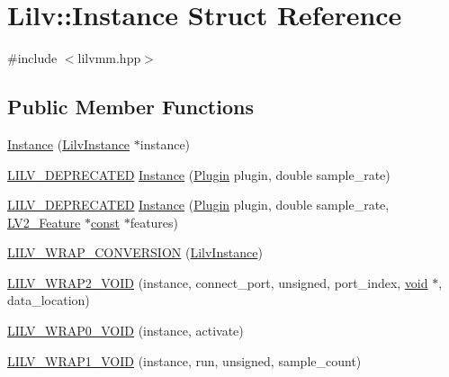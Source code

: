 \hypertarget{struct_lilv_1_1_instance}{}\section{Lilv\+:\+:Instance Struct Reference}
\label{struct_lilv_1_1_instance}


{\ttfamily \#include $<$lilvmm.\+hpp$>$}

\subsection*{Public Member Functions}
\begin{DoxyCompactItemize}
\item 
\hyperlink{struct_lilv_1_1_instance_af45ee5a3a37b886c6942b7970c3f14f7}{Instance} (\hyperlink{lilv_8h_acdb0d241e2506a6f59bd2d8dd427b99c}{Lilv\+Instance} $\ast$instance)
\item 
\hyperlink{lilvmm_8hpp_ad5b2c7073baa8fabd3c3b9429fee92a4}{L\+I\+L\+V\+\_\+\+D\+E\+P\+R\+E\+C\+A\+T\+ED} \hyperlink{struct_lilv_1_1_instance_a2df045ec92a0e8104b4bf7ab0bba9595}{Instance} (\hyperlink{struct_lilv_1_1_plugin}{Plugin} plugin, double sample\+\_\+rate)
\item 
\hyperlink{lilvmm_8hpp_ad5b2c7073baa8fabd3c3b9429fee92a4}{L\+I\+L\+V\+\_\+\+D\+E\+P\+R\+E\+C\+A\+T\+ED} \hyperlink{struct_lilv_1_1_instance_a65219ea225432cf20d4aa628cafb9b52}{Instance} (\hyperlink{struct_lilv_1_1_plugin}{Plugin} plugin, double sample\+\_\+rate, \hyperlink{lv2_8h_a78d13b607443404459db283371723234}{L\+V2\+\_\+\+Feature} $\ast$\hyperlink{getopt1_8c_a2c212835823e3c54a8ab6d95c652660e}{const} $\ast$features)
\item 
\hyperlink{struct_lilv_1_1_instance_a786fac19700a873f74b625e0bbff58f1}{L\+I\+L\+V\+\_\+\+W\+R\+A\+P\+\_\+\+C\+O\+N\+V\+E\+R\+S\+I\+ON} (\hyperlink{lilv_8h_acdb0d241e2506a6f59bd2d8dd427b99c}{Lilv\+Instance})
\item 
\hyperlink{struct_lilv_1_1_instance_a63179686a575cab5bdad5fbe55ab558f}{L\+I\+L\+V\+\_\+\+W\+R\+A\+P2\+\_\+\+V\+O\+ID} (instance, connect\+\_\+port, unsigned, port\+\_\+index, \hyperlink{sound_8c_ae35f5844602719cf66324f4de2a658b3}{void} $\ast$, data\+\_\+location)
\item 
\hyperlink{struct_lilv_1_1_instance_a4ab03ee90ad376ddf52701cc22d4a257}{L\+I\+L\+V\+\_\+\+W\+R\+A\+P0\+\_\+\+V\+O\+ID} (instance, activate)
\item 
\hyperlink{struct_lilv_1_1_instance_a1534c6a0987e6f075cd3b1dbc393fc84}{L\+I\+L\+V\+\_\+\+W\+R\+A\+P1\+\_\+\+V\+O\+ID} (instance, run, unsigned, sample\+\_\+count)

\end{DoxyCompactItemize}
